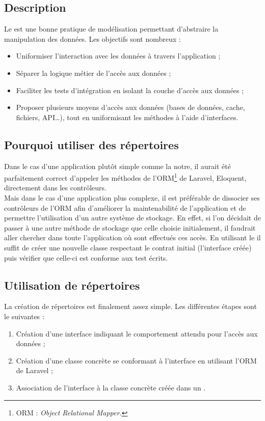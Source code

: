 	\subsection{Description}
		Le \repositoryPattern{} est une bonne pratique de modélisation permettant d'abstraire la manipulation des données. Les objectifs sont nombreux :
		\begin{itemize}
			\item Uniformiser l’interaction avec les données à travers l'application ;
			\item Séparer la logique métier de l'accès aux données ;
			\item Faciliter les tests d'intégration en isolant la couche d'accès aux données ;
			\item Proposer plusieurs moyens d'accès aux données (bases de données, cache, fichiers, API\dots), tout en uniformisant les méthodes à l'aide d'interfaces.
		\end{itemize}

	\subsection{Pourquoi utiliser des répertoires}
		Dans le cas d'une application plutôt simple comme la notre, il aurait été parfaitement correct d'appeler les méthodes de l'ORM\footnote{ORM : \textit{Object Relational Mapper.}} de Laravel, Eloquent, directement dans les contrôleurs.\\

		Mais dans le cas d'une application plus complexe, il est préférable de dissocier ses contrôleurs de l'ORM afin d'améliorer la maintenabilité de l'application et de permettre l'utilisation d'un autre système de stockage. En effet, si l'on décidait de passer à une autre méthode de stockage que celle choisie initialement, il faudrait aller chercher dans toute l'application où sont effectués ces accès. En utilisant le \repositoryPattern{} il suffit de créer une nouvelle classe respectant le contrat initial (l'interface créée) puis vérifier que celle-ci est conforme aux test écrits.

	\subsection{Utilisation de répertoires}
		La création de répertoires est finalement assez simple. Les différentes étapes sont le suivantes :
		\begin{enumerate}
			\item Création d'une interface indiquant le comportement attendu pour l'accès aux données ;
			\item Création d'une classe concrète se conformant à l'interface en utilisant l'ORM de Laravel ;
			\item Association de l'interface à la classe concrète créée dans un \serviceProvider.
		\end{enumerate}

